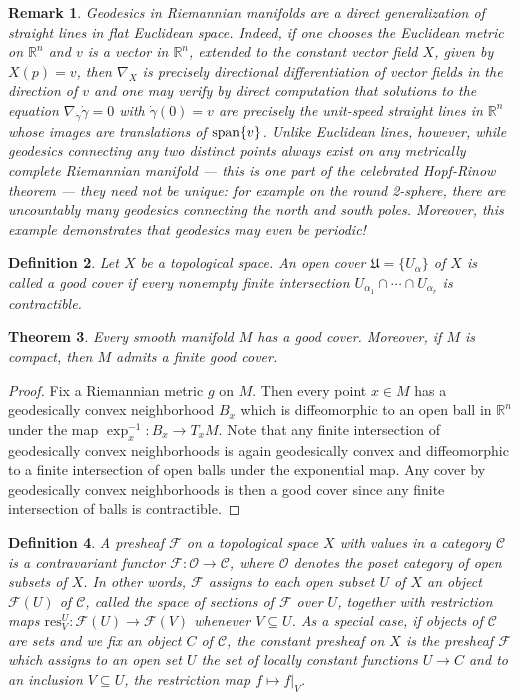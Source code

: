 \documentclass{amsart}          %
\newtheorem{theorem}{Theorem}
\newtheorem{definition}[theorem]{Definition}
\newtheorem{remark}[theorem]{Remark}
\newcommand{\R}{\mathbb R}
\newcommand{\res}{\mathrm{res}}
\begin{document}
\begin{remark}
	Geodesics in Riemannian manifolds are a direct generalization of straight lines in flat Euclidean space. Indeed, if one chooses the Euclidean metric on $\R^n$ and $v$ is a vector in $\R^n$, extended to the constant vector field $X$, given by $X(p)=v$, then $\nabla_{X}$ is precisely directional differentiation of vector fields in the direction of $v$ and one may verify by direct computation that solutions to the equation $\nabla_{\dot{\gamma}}\dot{\gamma}=0$ with $\dot{\gamma}(0)=v$ are precisely the unit-speed straight lines in $\R^n$ whose images are translations of $\textup{span}\{v\}$. Unlike Euclidean lines, however, while geodesics connecting any two distinct points always exist on any metrically complete Riemannian manifold --- this is one part of the celebrated Hopf-Rinow theorem --- they need not be unique: for example on the round 2-sphere, there are uncountably many geodesics connecting the north and south poles. Moreover, this example demonstrates that geodesics may even be periodic!
\end{remark}
\begin{definition}
	Let $X$ be a topological space. An open cover $\mathfrak{U}=\{U_\alpha\}$ of $X$ is called a \textup{good cover} if every nonempty finite intersection $U_{\alpha_1}\cap\cdots\cap U_{\alpha_r}$ is contractible.
\end{definition}
\begin{theorem}
	Every smooth manifold $M$ has a good cover. Moreover, if $M$ is compact, then $M$ admits a finite good cover.
\end{theorem}
\begin{proof}
	Fix a Riemannian metric $g$ on $M$. Then every point $x\in M$ has a geodesically convex neighborhood $B_x$ which is diffeomorphic to an open ball in $\R^n$ under the map $\exp_x^{-1}:B_x\to T_xM$. Note that any finite intersection of geodesically convex neighborhoods is again geodesically convex and diffeomorphic to a finite intersection of open balls under the exponential map. Any cover by geodesically convex neighborhoods is then a good cover since any finite intersection of balls is contractible.
\end{proof}
\begin{definition}
	A \textup{presheaf} $\mathscr{F}$ on a topological space $X$ with values in a category $\mathscr{C}$ is a contravariant functor $\mathscr{F}:\mathscr{O}\to\mathscr{C}$, where $\mathscr{O}$ denotes the poset category of open subsets of $X$. In other words, $\mathscr{F}$ assigns to each open subset $U$ of $X$ an object $\mathscr{F}(U)$ of $\mathscr{C}$, called the space of sections of $\mathscr{F}$ over $U$, together with \textup{restriction maps} $\res_V^U:\mathscr{F}(U)\to\mathscr{F}(V)$ whenever $V\subseteq U$. As a special case, if objects of $\mathscr{C}$ are sets and we fix an object $C$ of $\mathscr{C}$, the \textup{constant presheaf} on $X$ is the presheaf $\mathscr{F}$ which assigns to an open set $U$ the set of locally constant functions $U\to C$ and to an inclusion $V\subseteq U$, the restriction map $f\mapsto f|_V$.
\end{definition}
\end{document}

